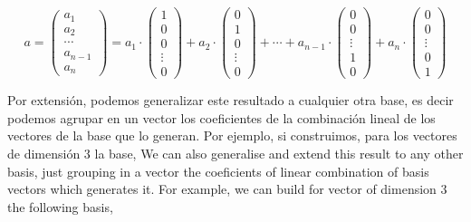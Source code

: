 \begin{equation*}
a=\begin{pmatrix}
a_1\\
a_2\\
\cdots  \\
a_{n-1}\\
a_n
\end{pmatrix} =a_1\cdot \begin{pmatrix}
1\\
0\\
0\\
\vdots \\
0
\end{pmatrix}+a_2 \cdot  \begin{pmatrix}
0\\
1\\
0\\
\vdots \\
0
\end{pmatrix}+
\cdots +
a_{n-1}\cdot \begin{pmatrix}
0\\
0\\
\vdots \\
1\\
0
\end{pmatrix}+
a_n\cdot \begin{pmatrix}
0\\
0\\
\vdots \\
0\\
1
\end{pmatrix}
\end{equation*}

\begin{paracol}{2}
Por extensión, podemos generalizar este resultado a cualquier otra base, es decir podemos agrupar en un vector los coeficientes de la combinación lineal de los vectores de la base que lo generan. Por ejemplo, si construimos, para los vectores de dimensión $3$ la base,
\switchcolumn
We can also generalise and extend this result to any other basis, just grouping in a vector the coeficients of linear combination of basis vectors which generates it. For example, we can build for vector of dimension $3$ the following basis,   
\end{paracol}


